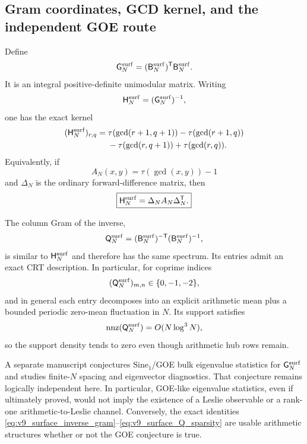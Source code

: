 \documentclass[11pt]{amsart}
\numberwithin{equation}{section}
\theoremstyle{plain}
\theoremstyle{definition}
\theoremstyle{remark}
\begin{document}
\subsection{Gram coordinates, GCD kernel, and the independent GOE route}

Define
\begin{equation}
\mathsf G_N^{\rm surf}
=
(\mathsf B_N^{\rm surf})^{\mathsf T}\mathsf B_N^{\rm surf}.
\label{eq:v9_surface_gram}
\end{equation}
It is an integral positive-definite unimodular matrix.  Writing
\[
\mathsf H_N^{\rm surf}
=
(\mathsf G_N^{\rm surf})^{-1},
\]
one has the exact kernel
\begin{align}
(\mathsf H_N^{\rm surf})_{r,q}
={}&
\tau(\gcd(r+1,q+1))
-\tau(\gcd(r+1,q))
\notag\\
&-\tau(\gcd(r,q+1))
+\tau(\gcd(r,q)).
\label{eq:v9_surface_inverse_gram}
\end{align}
Equivalently, if
\[
A_N(x,y)=\tau(\gcd(x,y))-1
\]
and $\Delta_N$ is the ordinary forward-difference matrix, then
\begin{equation}
\boxed{
\mathsf H_N^{\rm surf}
=
\Delta_NA_N\Delta_N^{\mathsf T}.
}
\label{eq:v9_surface_gcd_difference}
\end{equation}

The column Gram of the inverse,
\begin{equation}
\mathsf Q_N^{\rm surf}
=
(\mathsf B_N^{\rm surf})^{-\mathsf T}
(\mathsf B_N^{\rm surf})^{-1},
\label{eq:v9_surface_Q}
\end{equation}
is similar to $\mathsf H_N^{\rm surf}$ and therefore has the same spectrum.  Its entries admit
an exact CRT description.  In particular, for coprime indices
\begin{equation}
(\mathsf Q_N^{\rm surf})_{m,n}\in\{0,-1,-2\},
\label{eq:v9_surface_Q_coprime_values}
\end{equation}
and in general each entry decomposes into an explicit arithmetic mean plus a bounded periodic
zero-mean fluctuation in $N$.  Its support satisfies
\begin{equation}
\operatorname{nnz}(\mathsf Q_N^{\rm surf})
=
O(N\log^3N),
\label{eq:v9_surface_Q_sparsity}
\end{equation}
so the support density tends to zero even though arithmetic hub rows remain.

A separate manuscript conjectures $\mathrm{Sine}_1$/GOE bulk eigenvalue statistics for
$\mathsf G_N^{\rm surf}$ and studies finite-$N$ spacing and eigenvector diagnostics.  That
conjecture remains logically independent here.  In particular, GOE-like eigenvalue statistics,
even if ultimately proved, would not imply the existence of a Leslie observable or a rank-one
arithmetic-to-Leslie channel.  Conversely, the exact identities
\eqref{eq:v9_surface_inverse_gram}--\eqref{eq:v9_surface_Q_sparsity} are usable arithmetic
structures whether or not the GOE conjecture is true.
\end{document}
